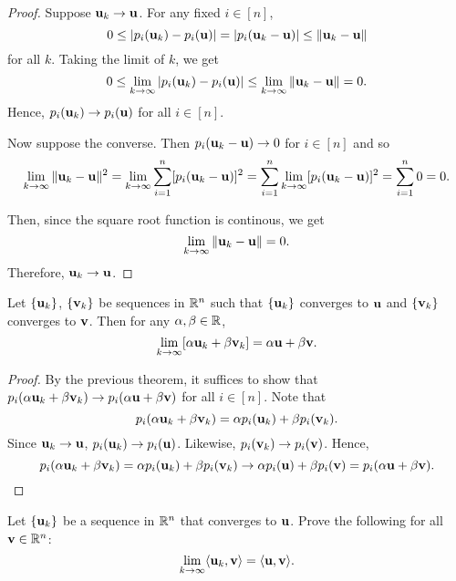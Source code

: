 \documentclass[letterpaper, twoside, 12pt]{book}
\begin{document}
\begin{proof}
    Suppose \(\mathbf u_k \to \mathbf u\). For any fixed \(i \in [n]\),
    \[ 0 \leq |p_i(\mathbf u_k) - p_i(\mathbf u)| = |p_i(\mathbf u_k - \mathbf u)|  \leq \|\mathbf u_k - \mathbf u \| \]
    for all \(k\). Taking the limit of \(k\), we get
    \[ 0 \leq \lim_{k \to \infty} |p_i(\mathbf u_k) - p_i(\mathbf u)| \leq \lim_{k \to \infty} \|\mathbf u_k - \mathbf u\| = 0 .\]
    Hence, \(p_i(\mathbf u_k) \to p_i(\mathbf u)\) for all \(i \in [n]\).


    Now suppose the converse. Then \(p_i(\mathbf u_k - \mathbf u) \to 0\) for \(i \in [n]\)
    and so
    \[ \lim_{k \to \infty} \|\mathbf u_k - \mathbf u \|^2 
        = \lim_{k \to \infty} \sum_{i = 1}^n [p_i(\mathbf u_k - \mathbf u)]^2 
        = \sum_{i = 1}^n \lim_{k \to \infty} [p_i(\mathbf u_k - \mathbf u)]^2 
        = \sum_{i = 1}^n 0 = 0 . \]

    Then, since the square root function is continous, we get 
    \[ \lim_{k \to \infty} \|\mathbf u_k - \mathbf u \| = 0 .\]
    Therefore, \(\mathbf u_k \to \mathbf u\).
\end{proof}

\begin{theorem}[10.10]
  Let \(\{\mathbf u_k\}\), \(\{\mathbf v_k\}\) be sequences in \(\mathbb R^n\)
  such that \(\{\mathbf u_k\}\) converges to \(\mathbf u\) and
  \(\{\mathbf v_k\}\) converges to \(\mathbf v\). Then for any
  \(\alpha,\beta\in\mathbb R\),
  \[
    \lim_{k\to\infty}[\alpha\mathbf u_k+\beta\mathbf v_k]
      =
    \alpha\mathbf u+\beta\mathbf v
  .\]
\end{theorem}

\begin{proof}
    By the previous theorem, it suffices to show that 
    \( p_{i}(\alpha \mathbf u_k + \beta \mathbf v_k) \to p_i(\alpha \mathbf u + \beta \mathbf v) \)
    for all \(i \in [n]\). Note that
    \[ p_i(\alpha \mathbf u_k + \beta \mathbf v_k) = \alpha p_i(\mathbf u_k) + \beta p_i(\mathbf v_k) .\]
    Since \(\mathbf u_k \to \mathbf u\), \(p_i(\mathbf u_k) \to p_i(\mathbf u)\).
    Likewise, \(p_i(\mathbf v_k) \to p_i(\mathbf v)\). Hence,
    \[  p_i(\alpha \mathbf u_k + \beta \mathbf v_k) = 
        \alpha p_i(\mathbf u_k) + \beta p_i(\mathbf v_k) 
        \to \alpha p_i(\mathbf u) + \beta p_i(\mathbf v) 
    = p_i(\alpha \mathbf u + \beta \mathbf v) .\]

\end{proof}

\begin{exercise}[1]
  Let \(\{\mathbf u_k\}\) be a sequence in \(\mathbb R^n\) that converges to
  \(\mathbf u\). Prove the following for all \(\mathbf v\in\mathbb R^n\):
  \[
    \lim_{k\to\infty}\langle\mathbf u_k,\mathbf v\rangle=\langle\mathbf u,\mathbf v\rangle
  .\]
\end{exercise}
\end{document}
